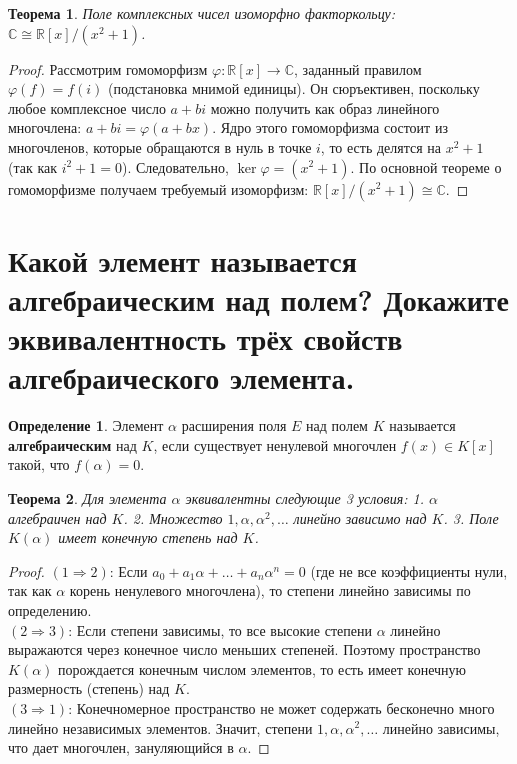 \documentclass[12pt, a4paper]{article}
\theoremstyle{definition}
\newtheorem{definition}{Определение}[section]
\theoremstyle{plain}
\newtheorem{theorem}{Теорема}[section]
\begin{document}
	\begin{theorem}
		Поле комплексных чисел изоморфно факторкольцу: $\mathbb{C} \cong \mathbb{R}[x]/(x^2+1)$.
	\end{theorem}
	\begin{proof}
		Рассмотрим гомоморфизм $\varphi: \mathbb{R}[x] \to \mathbb{C}$, заданный правилом $\varphi(f) = f(i)$ (подстановка мнимой единицы). Он сюръективен, поскольку любое комплексное число $a+bi$ можно получить как образ линейного многочлена: $a+bi = \varphi(a+bx)$. 
		Ядро этого гомоморфизма состоит из многочленов, которые обращаются в нуль в точке $i$, то есть делятся на $x^2+1$ (так как $i^2+1=0$). Следовательно, $\ker \varphi = (x^2+1)$. 
		По основной теореме о гомоморфизме получаем требуемый изоморфизм: $\mathbb{R}[x]/(x^2+1) \cong \mathbb{C}$.
	\end{proof}
	
	\newpage
	\setcounter{section}{52}
	\section{Какой элемент называется алгебраическим над полем? Докажите эквивалентность трёх свойств алгебраического элемента.}
	
	\begin{definition}
		Элемент $\alpha$ расширения поля $E$ над полем $K$ называется \textbf{алгебраическим} над $K$, если существует ненулевой многочлен $f(x) \in K[x]$ такой, что $f(\alpha)=0$.
	\end{definition}
	
	\begin{theorem}
		Для элемента $\alpha$ эквивалентны следующие 3 условия:
		1. $\alpha$ алгебраичен над $K$.
		2. Множество $1, \alpha, \alpha^2, \dots$ линейно зависимо над $K$.
		3. Поле $K(\alpha)$ имеет конечную степень над $K$.
	\end{theorem}
	\begin{proof}
		$(1 \Rightarrow 2)$: Если $a_0 + a_1\alpha + \dots + a_n\alpha^n = 0$ (где не все коэффициенты нули, так как $\alpha$ корень ненулевого многочлена), то степени линейно зависимы по определению. \\
		$(2 \Rightarrow 3)$: Если степени зависимы, то все высокие степени $\alpha$ линейно выражаются через конечное число меньших степеней. Поэтому пространство $K(\alpha)$ порождается конечным числом элементов, то есть имеет конечную размерность (степень) над $K$. \\
		$(3 \Rightarrow 1)$: Конечномерное пространство не может содержать бесконечно много линейно независимых элементов. Значит, степени $1, \alpha, \alpha^2, \dots$ линейно зависимы, что дает многочлен, зануляющийся в $\alpha$.
	\end{proof}
	
\end{document}
